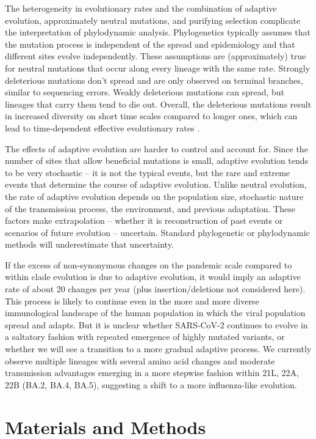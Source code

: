 \documentclass[aps,rmp, twocolumn]{revtex4}
\begin{document}
The heterogeneity in evolutionary rates and the combination of adaptive evolution, approximately neutral mutations, and purifying selection complicate the interpretation of phylodynamic analysis.
Phylogenetics typically assumes that the mutation process is independent of the spread and epidemiology and that different sites evolve independently.
These assumptions are (approximately) true for neutral mutations that occur along every lineage with the same rate.
Strongly deleterious mutations don't spread and are only observed on terminal branches, similar to sequencing errors.
Weakly deleterious mutations can spread, but lineages that carry them tend to die out.
Overall, the deleterious mutations result in increased diversity on short time scales compared to longer ones, which can lead to time-dependent effective evolutionary rates \citep{wertheim_purifying_2011}.

The effects of adaptive evolution are harder to control and account for.
Since the number of sites that allow beneficial mutations is small, adaptive evolution tends to be very stochastic -- it is not the typical events, but the rare and extreme events that determine the course of adaptive evolution.
Unlike neutral evolution, the rate of adaptive evolution depends on the population size, stochastic nature of the transmission process, the environment, and previous adaptation.
These factors make extrapolation -- whether it is reconstruction of past events or scenarios of future evolution -- uncertain.
Standard phylogenetic or phylodynamic methods will underestimate that uncertainty.

If the excess of non-synonymous changes on the pandemic scale compared to within clade evolution is due to adaptive evolution, it would imply an adaptive rate of about 20 changes per year (plus insertion/deletions not considered here).
This process is likely to continue even in the more and more diverse immunological landscape of the human population in which the viral population spread and adapts.
But it is unclear whether SARS-CoV-2 continues to evolve in a saltatory fashion with repeated emergence of highly mutated variants, or whether we will see a transition to a more gradual adaptive process.
We currently observe multiple lineages with several amino acid changes and moderate transmission advantages emerging in a more stepwise fashion within 21L, 22A, 22B (BA.2, BA.4, BA.5), suggesting a shift to a more influenza-like evolution.

\section*{Materials and Methods}
\end{document}
